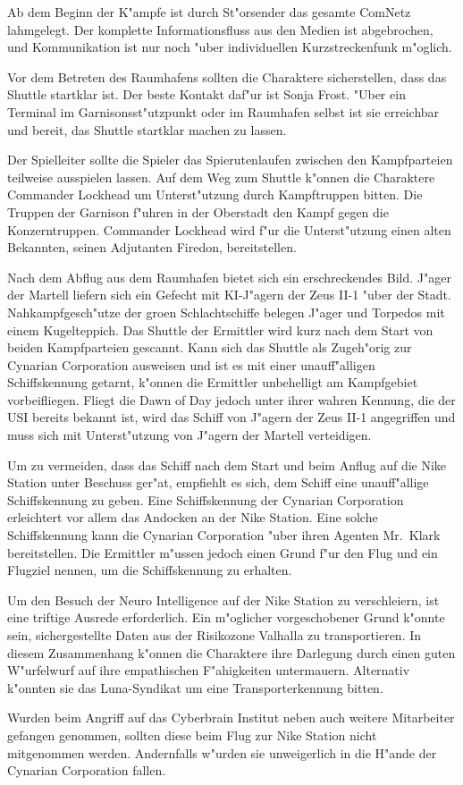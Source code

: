 Ab dem Beginn der K"ampfe ist durch St"orsender das gesamte ComNetz lahmgelegt. Der komplette Informationsfluss aus den Medien ist abgebrochen, und Kommunikation ist nur noch "uber individuellen Kurzstreckenfunk m"oglich.

Vor dem Betreten des Raumhafens sollten die Charaktere sicherstellen, dass das Shuttle startklar ist. Der beste Kontakt daf"ur ist Sonja Frost. "Uber ein Terminal im Garnisonsst"utzpunkt oder im Raumhafen selbst ist sie erreichbar und bereit, das Shuttle startklar machen zu lassen.

Der Spielleiter sollte die Spieler das Spie\3rutenlaufen zwischen den Kampfparteien teilweise ausspielen lassen. Auf dem Weg zum Shuttle k"onnen die Charaktere Commander Lockhead um Unterst"utzung durch Kampftruppen bitten. Die Truppen der Garnison f"uhren in der Oberstadt den Kampf gegen die Konzerntruppen. Commander Lockhead wird f"ur die Unterst"utzung einen alten Bekannten, seinen Adjutanten Firedon, bereitstellen.

Nach dem Abflug aus dem Raumhafen bietet sich ein erschreckendes Bild. J"ager der Martell liefern sich ein Gefecht mit KI-J"agern der Zeus II-1 "uber der Stadt. Nahkampfgesch"utze der gro\3en Schlachtschiffe belegen J"ager und Torpedos mit einem Kugelteppich. Das Shuttle der Ermittler wird kurz nach dem Start von beiden Kampfparteien gescannt. Kann sich das Shuttle als Zugeh"orig zur Cynarian Corporation ausweisen und ist es mit einer unauff"alligen Schiffskennung getarnt, k"onnen die Ermittler unbehelligt am Kampfgebiet vorbeifliegen. Fliegt die Dawn of Day jedoch unter ihrer wahren Kennung, die der USI bereits bekannt ist, wird das Schiff von J"agern der Zeus II-1 angegriffen und muss sich mit Unterst"utzung von J"agern der Martell verteidigen.

Um zu vermeiden, dass das Schiff nach dem Start und beim Anflug auf die Nike Station unter Beschuss ger"at, empfiehlt es sich, dem Schiff eine unauff"allige Schiffskennung zu geben. Eine Schiffskennung der Cynarian Corporation erleichtert vor allem das Andocken an der Nike Station. Eine solche Schiffskennung kann die Cynarian Corporation "uber ihren Agenten Mr.~Klark bereitstellen. Die Ermittler m"ussen jedoch einen Grund f"ur den Flug und ein Flugziel nennen, um die Schiffskennung zu erhalten.

Um den Besuch der Neuro Intelligence auf der Nike Station zu verschleiern, ist eine triftige Ausrede erforderlich. Ein m"oglicher vorgeschobener Grund k"onnte sein, sichergestellte Daten aus der Risikozone Valhalla zu transportieren. In diesem Zusammenhang k"onnen die Charaktere ihre Darlegung durch einen guten W"urfelwurf auf ihre empathischen F"ahigkeiten untermauern. Alternativ k"onnten sie das Luna-Syndikat um eine Transporterkennung bitten.

\begin{remarks}
    Wurden beim Angriff auf das Cyberbrain Institut neben \ml{} auch weitere Mitarbeiter gefangen genommen, sollten diese beim Flug zur Nike Station nicht mitgenommen werden. Andernfalls w"urden sie unweigerlich in die H"ande der Cynarian Corporation fallen.
\end{remarks}
